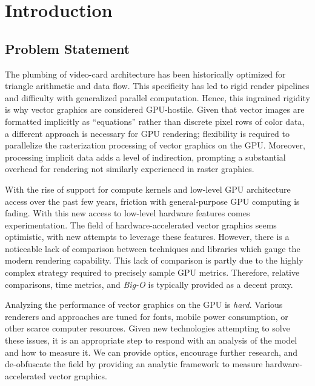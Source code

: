 \chapter{Introduction}\label{sec:introduction}

\section{Problem Statement}\label{sec:problem_statement}
The plumbing of video-card architecture has been historically optimized for triangle arithmetic and data flow. This specificity has led to rigid render pipelines and difficulty with generalized parallel computation. Hence, this ingrained rigidity is why vector graphics are considered GPU-hostile. Given that vector images are formatted implicitly as ``equations'' rather than discrete pixel rows of color data, a different approach is necessary for GPU rendering; flexibility is required to parallelize the rasterization processing of vector graphics on the GPU. Moreover, processing implicit data adds a level of indirection, prompting a substantial overhead for rendering not similarly experienced in raster graphics.\medskip

With the rise of support for compute kernels and low-level GPU architecture access over the past few years, friction with general-purpose GPU computing is fading. With this new access to low-level hardware features comes experimentation. The field of hardware-accelerated vector graphics seems optimistic, with new attempts to leverage these features. However, there is a noticeable lack of comparison between techniques and libraries which gauge the modern rendering capability. This lack of comparison is partly due to the highly complex strategy required to precisely sample GPU metrics. Therefore, relative comparisons, time metrics, and \textit{Big-O} is typically provided as a decent proxy.\medskip

Analyzing the performance of vector graphics on the GPU is \emph{hard}. Various renderers and approaches are tuned for fonts, mobile power consumption, or other scarce computer resources. Given new technologies attempting to solve these issues, it is an appropriate step to respond with an analysis of the model and how to measure it. We can provide optics, encourage further research, and de-obfuscate the field by providing an analytic framework to measure hardware-accelerated vector graphics.

